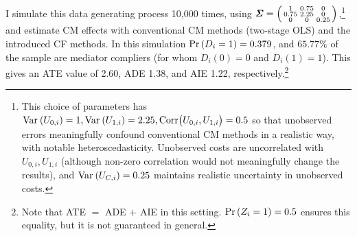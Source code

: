 I simulate this data generating process 10,000 times, using $\boldsymbol{\mathit{\Sigma}} =
\left(\begin{smallmatrix} 1 & 0.75 & 0 \\ 0.75 & 2.25 & 0 \\ 0 & 0 & 0.25 \end{smallmatrix}\right)$,\footnote{
    This choice of parameters has $\text{Var}_{} \left( U_{0,i} \right) = 1, \text{Var}_{} \left( U_{1,i} \right) = 2.25, \text{Corr}\big(U_{0,i}, U_{1,i}\big) = 0.5$ so that unobserved errors meaningfully confound conventional CM methods in a realistic way, with notable heteroscedasticity.
    Unobserved costs are uncorrelated with $U_{0,i}, U_{1,i}$ (although non-zero correlation would not meaningfully change the results), and $\text{Var}_{} \left( U_{C,i} \right) = 0.25$ maintains realistic uncertainty in unobserved costs.
}
and estimate CM effects with conventional CM methods (two-stage OLS) and the introduced CF methods.
In this simulation $\Pr\left( D_i = 1 \right) = 0.379$, and $65.77\%$ of the sample are mediator compliers (for whom $D_i(0)=0$ and $D_i(1)=1$).
This gives an ATE value of 2.60, ADE 1.38, and AIE 1.22, respectively.\footnote{
    Note that ATE $=$ ADE $+$ AIE in this setting.
    $\Pr\left( Z_i=1 \right) = 0.5$ ensures this equality, but it is not guaranteed in general.
}

